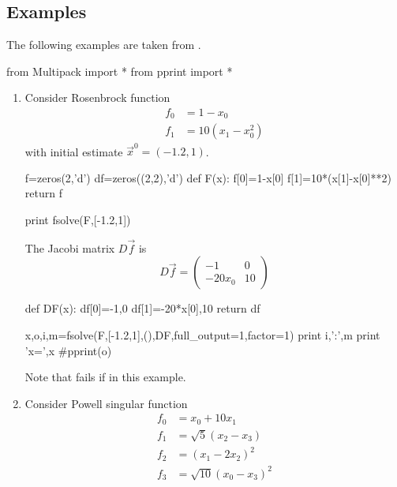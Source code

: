 \ifwithexamples
\subsection{Examples}
\pythonreset
The following examples are taken from
.
\begin{python}
from Multipack import *
from pprint import *
\end{python}
\begin{enumerate}
\item Consider Rosenbrock function
  \begin{displaymath}
    \begin{split}
      f_0&=1-x_0\\
      f_1&=10(x_1-x_0^2)
    \end{split}
  \end{displaymath}
  with initial estimate $\vec x^0=(-1.2,1)$.
\begin{python}
f=zeros(2,'d')
df=zeros((2,2),'d')
def F(x):
    f[0]=1-x[0]
    f[1]=10*(x[1]-x[0]**2)
    return f
\end{python}
\begin{pythonrun}
print fsolve(F,[-1.2,1])
\end{pythonrun}
The Jacobi matrix $D\vec f$ is
\begin{displaymath}
  D\vec f=
  \begin{pmatrix}
    -1 & 0 \\ -20x_0 &10
  \end{pmatrix}
\end{displaymath}
\begin{python}
def DF(x):
    df[0]=-1,0
    df[1]=-20*x[0],10
    return df
\end{python}
\begin{pythonrun}
x,o,i,m=fsolve(F,[-1.2,1],(),DF,full_output=1,factor=1)
print i,':',m
print 'x=',x
#pprint(o)
\end{pythonrun}
Note that  fails if  in this example.
\item Consider Powell singular function
  \begin{displaymath}
    \begin{split}
      f_0&=x_0+10x_1\\
      f_1&=\sqrt5(x_2-x_3)\\
      f_2&=(x_1-2x_2)^2\\
      f_3&=\sqrt{10}(x_0-x_3)^2
    \end{split}
  \end{displaymath}

\end{enumerate}
